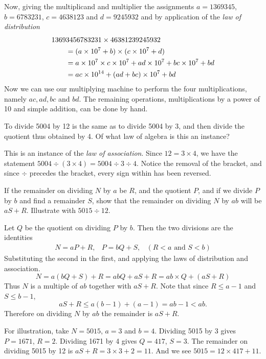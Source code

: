 \documentclass[DIN, pagenumber=false, fontsize=11pt, parskip=half]{scrartcl}
\begin{document}
\begin{problems}[from=1,step=1]
    Now, giving the multiplicand and multiplier the assignments $a = 1369345$, $b = 6783231$, $c = 4638123$ and $d = 9245932$ and by application of the \emph{law of distribution}
    \begin{align*}
        \MoveEqLeft 13693456783231 \times 46381239245932 \\ 
            & = (a \times 10^7 + b) \times (c \times 10^7 + d)\\ 
            & = a \times 10^7 \times c \times 10^7 + ad \times 10^7 + bc \times 10^7 + bd\\
            & = ac \times 10^{14} + (ad + bc) \times 10^7 + bd
    \end{align*}
    Now we can use our multiplying machine to perform the four multiplications, namely $ac, ad, bc$ and $bd$. The remaining operations, multiplications by a power of 10 and simple addition, can be done by hand.


    \problem To divide 5004 by 12 is the same as to divide 5004 by 3, and then divide the quotient thus obtained by 4. Of what law of algebra is this an instance?

    \answer This is an instance of the \textit{law of association}. 
    Since $12 = 3 \times 4$, we have the statement $5004 \div (3 \times 4) = 5004 \div 3 \div 4$.
    Notice the removal of the bracket, and since $\div$ precedes the bracket, every sign within has been reversed.

    \problem If the remainder on dividing $N$ by $a$ be $R$, and the quotient $P$, and if we divide $P$ by $b$ and find a remainder $S$, show that the remainder on dividing $N$ by $ab$ will be $aS + R$. Illustrate with $5015 \div 12$.

    \answer Let $Q$ be the quotient on dividing $P$ by $b$.
    Then the two divisions are the identities
    \[
        \begin{array}{lcr}
            N = aP + R, & P = bQ + S, & (R < a \text{ and } S < b)
        \end{array}
    \]
    Substituting the second in the first, and applying the laws of distribution and association.
    \[ 
        N = a(bQ+S)+R = abQ+aS+ R = ab \times Q + (aS+R)
    \]
    Thus $N$ is a multiple of $ab$ together with $aS+R$.
    Note that since $R \leq a-1$ and $S \leq b-1$,
    \[
        aS+R \leq a(b-1) + (a-1) = ab-1 < ab.
    \]
    Therefore on dividing $N$ by $ab$ the remainder is $aS+R$.

    For illustration, take $N=5015$, $a=3$ and $b=4$.
    Dividing 5015 by 3 gives $P=1671$, $R=2$.
    Dividing 1671 by 4 gives $Q=417$, $S=3$.
    The remainder on dividing 5015 by 12 is $aS + R = 3 \times 3 + 2 = 11$.
    And we see $5015 = 12 \times 417 + 11$.


\end{problems}
\end{document}
